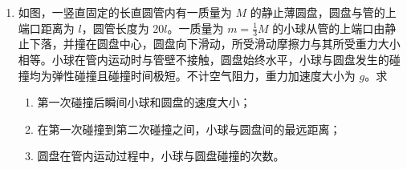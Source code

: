 \documentclass[\gkver]{gaokaozhenti}
\begin{document}
\begin{enumerate}
{B、C 处的点电荷在 N 点的电场强度方向相反，由上图可知合电场强度 $E_{BC}$ 由 B 指向 C，大小为

$E_{BC} = \frac{kq}{(L/2)^{2}} - \frac{kq_{C}}{(L/2)^{2}} = \frac{4k(q - q_{C})}{L^{2}}$

由几何关系有

$E_{A}' = E_{BC}\tan 30^{\circ}$

联立解得

$q_{C} = \frac{3 - \sqrt 3}{3}q$
}

\item
如图，一竖直固定的长直圆管内有一质量为 $M$ 的静止薄圆盘，圆盘与管的上端口距离为 $l$，圆管长度为 20$l$。一质量为 $m = \frac{1}{3}M$ 的小球从管的上端口由静止下落，并撞在圆盘中心，圆盘向下滑动，所受滑动摩擦力与其所受重力大小相等。小球在管内运动时与管壁不接触，圆盘始终水平，小球与圆盘发生的碰撞均为弹性碰撞且碰撞时间极短。不计空气阻力，重力加速度大小为 $g$。求
\begin{enumerate}
	\item
	第一次碰撞后瞬间小球和圆盘的速度大小；
	\item
	在第一次碰撞到第二次碰撞之间，小球与圆盘间的最远距离；
	\item
	圆盘在管内运动过程中，小球与圆盘碰撞的次数。
\end{enumerate}
\end{enumerate}
\end{document}
